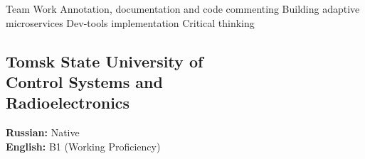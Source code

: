 \documentclass[a4paper]{MagicalCV}
\begin{document}
\begin{minipage}[t]{0.33\textwidth}

Team Work \textbullet{}
Annotation, documentation and code commenting \textbullet{}
Building adaptive microservices \textbullet{}
Dev-tools implementation \textbullet{}
Critical thinking
\sectionsep


\subsection{Tomsk State University of \\ Control Systems and \\ Radioelectronics}
\vspace{\topsep} %
\sectionsep


\textbf{Russian:} Native \\
\textbf{English:} B1 (Working Proficiency)
\sectionsep

\end{minipage} 
\hfill
\end{document}
